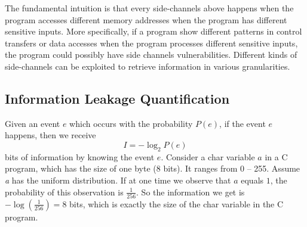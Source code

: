 The fundamental intuition is that every side-channels above happens when the program accesses different 
memory addresses when the program has different sensitive inputs. More specifically, if 
a program show different patterns in control transfers or data accesses when the program 
processes different sensitive inputs, the program could possibly have side channels vulnerabilities. 
Different kinds of side-channels can be exploited to retrieve information
in various granularities. 

%


\subsection{Information Leakage Quantification}


Given an event $e$ which occurs with the probability $P(e)$, if the event $e$ happens, 
then we receive
\begin{displaymath}
    I = - \log_2P(e)
\end{displaymath}
bits of information by knowing the event $e$.
Consider a char variable $a$ in a C program, which has the size
of one byte (8 bits). It ranges from 0 -- 255.  Assume
 \textit{a} has the uniform distribution. If at one time we observe that $a$
equals $1$, the probability of this observation is $\frac{1}{256}$. So the information we get is 
$-\log(\frac{1}{256}) = 8$ bits, which is exactly the size of the char variable in the C program.

